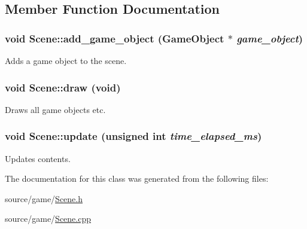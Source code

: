 \subsection{Member Function Documentation}
\hypertarget{classScene_af4940a9c9e62cb5ced3e7f5206d903a3}{
\subsubsection[{add\_\-game\_\-object}]{\setlength{\rightskip}{0pt plus 5cm}void Scene::add\_\-game\_\-object ({\bf GameObject} $\ast$ {\em game\_\-object})}}
\label{classScene_af4940a9c9e62cb5ced3e7f5206d903a3}
Adds a game object to the scene. \hypertarget{classScene_a41fbbe388ea322df338648e66611ffcf}{
\subsubsection[{draw}]{\setlength{\rightskip}{0pt plus 5cm}void Scene::draw (void)}}
\label{classScene_a41fbbe388ea322df338648e66611ffcf}
Draws all game objects etc. \hypertarget{classScene_a065d1b88078a09f2b77e80f663a40b2d}{
\subsubsection[{update}]{\setlength{\rightskip}{0pt plus 5cm}void Scene::update (unsigned int {\em time\_\-elapsed\_\-ms})}}
\label{classScene_a065d1b88078a09f2b77e80f663a40b2d}
Updates contents. 

The documentation for this class was generated from the following files:\begin{DoxyCompactItemize}
\item 
source/game/\hyperlink{Scene_8h}{Scene.h}\item 
source/game/\hyperlink{Scene_8cpp}{Scene.cpp}\end{DoxyCompactItemize}
